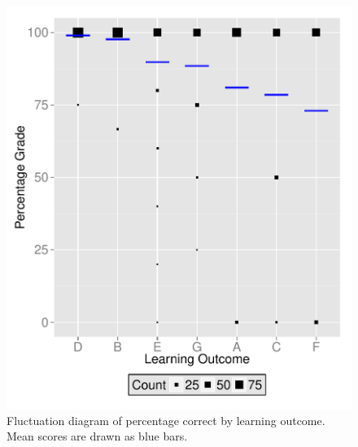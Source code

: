 \documentclass[12pt,english,nohyper]{tufte-handout}\usepackage[]{graphicx}\usepackage[]{color}
\begin{document}
\vspace{5mm}

\begin{figure}[!ht]
\includegraphics[width=\linewidth]{Topic04_CD_LearningObj_boxplot.pdf}
\caption{Fluctuation diagram of percentage correct by learning outcome. Mean scores are drawn as blue bars.}
\label{fig:LearningObj_summary}
\end{figure}
\end{document}
